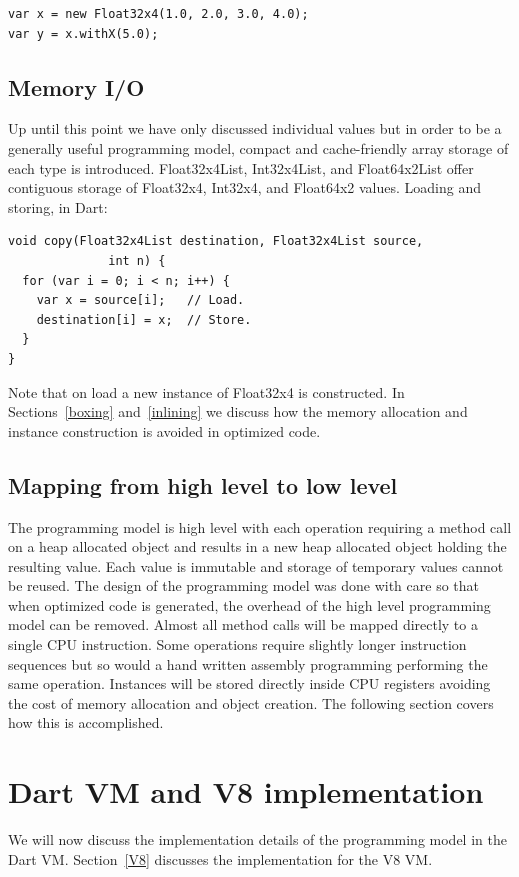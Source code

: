 \documentclass[preprint]{sigplanconf}
\begin{document}
\begin{verbatim}
var x = new Float32x4(1.0, 2.0, 3.0, 4.0);
var y = x.withX(5.0);
\end{verbatim}

\subsection{Memory I/O}
Up until this point we have only discussed individual values but in order to be a generally useful programming model, compact and cache-friendly array storage of each type is introduced. Float32x4List, Int32x4List, and Float64x2List offer contiguous storage of Float32x4, Int32x4, and Float64x2 values. Loading and storing, in Dart:

\begin{verbatim}
void copy(Float32x4List destination, Float32x4List source,
	          int n) {
  for (var i = 0; i < n; i++) {
    var x = source[i];   // Load.
    destination[i] = x;  // Store.
  }
}
\end{verbatim}

Note that on load a new instance of Float32x4 is constructed. In Sections~\ref{boxing} and~\ref{inlining} we discuss how the memory allocation and instance construction is avoided in optimized code.

\subsection{Mapping from high level to low level}
The programming model is high level with each operation requiring a method call on a heap allocated object and results in a new heap allocated object holding the resulting value. Each value is immutable and storage of temporary values cannot be reused. The design of the programming model was done with care so that when optimized code is generated, the overhead of the high level programming model can be removed. Almost all method calls will be mapped directly to a single CPU instruction. Some operations require slightly longer instruction sequences but so would a hand written assembly programming performing the same operation. Instances will be stored directly inside CPU registers avoiding the cost of memory allocation and object creation. The following section covers how this is accomplished.

\section{Dart VM and V8 implementation}
We will now discuss the implementation details of the programming model in the Dart VM. Section~\ref{V8} discusses the implementation for the V8 VM.
\end{document}
